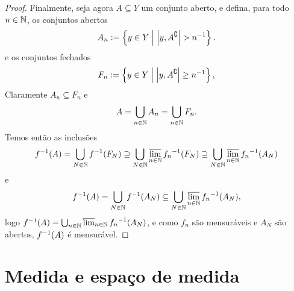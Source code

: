 \begin{proof}
Finalmente, seja agora $A \subseteq Y$ um conjunto aberto, e defina, para todo $n \in \mathbb{N}$, os conjuntos abertos
	\begin{equation*}
	A_n := \left\{{y \in Y}\;\middle\vert\;{\left\vert{y},{A^\complement}\right\vert > n^{-1}}\right\}.
	\end{equation*}
e os conjuntos fechados
	\begin{equation*}
	F_n := \left\{{y \in Y}\;\middle\vert\;{\left\vert{y},{A^\complement}\right\vert \geq n^{-1}}\right\},
	\end{equation*}
Claramente $A_n \subseteq F_n$ e
	\begin{equation*}
	A = \bigcup_{n \in \mathbb{N}} A_n = \bigcup_{n \in \mathbb{N}} F_n.
	\end{equation*}
Temos então as inclusões
	\begin{equation*}
	f^{-1}(A) = \bigcup_{N \in \mathbb{N}} f^{-1}(F_N) \supseteq \bigcup_{N \in \mathbb{N}}\varlimsup_{n \in \mathbb{N}} {f_n}^{-1}(F_N) \supseteq \bigcup_{N \in \mathbb{N}} \varlimsup_{n \in \mathbb{N}} {f_n}^{-1}(A_N)
	\end{equation*}
e
	\begin{equation*}
	f^{-1}(A) = \bigcup_{N \in \mathbb{N}} f^{-1}(A_N) \subseteq \bigcup_{N \in \mathbb{N}} \varlimsup_{n \in \mathbb{N}} {f_n}^{-1}(A_N),
	\end{equation*}
logo $f^{-1}(A) = \bigcup_{n \in \mathbb{N}} \varlimsup_{n \in \mathbb{N}} {f_n}^{-1}(A_N)$, e como $f_n$ são mensuráveis e $A_N$ são abertos, $f^{-1}(A)$ é mensurável.
\end{proof}

















\section{Medida e espaço de medida}

